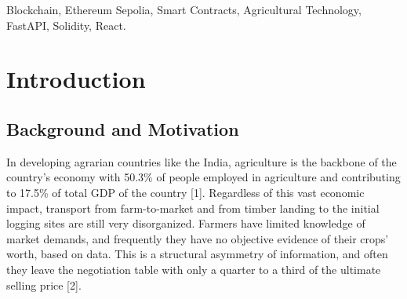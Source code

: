 \documentclass[conference]{IEEEtran}
\begin{document}
\begin{abstract}
At the moment, tracking agricultural produce to its origin is very large challenge as there is lack of market information transparency. This loss of information is the opportunity that middlemen take advantage of and reduces the power of farmers in their negotiations over their produce. To address this, we created FarmChain AI - a platform specifically created to empower farmers at harvest. We integrated Python-powered AI predictive tools with smart contracts on Ethereum that are untamperable. The heart of the system is built with React 18, Node.js, Express, Supabase, FastAPI and Solidity. The platform implements the complete supply chain lifecycle across six stakeholder roles: Farmer, Admin, Processor, Distributor, Retailer, and Consumer. Each custody transfer is permanently recorded on the Ethereum Sepolia Testnet via a \texttt{FarmChain.sol} smart contract that enforces cryptographic ownership verification. For market price prediction, we trained an XGBoost Regressor on 2{,}940 historical price records spanning 7 commodities across 7 Indian agricultural markets. The model uses 30 leakage-free time-series features and achieves a MAPE of 2.72\% and $R^2$ of 0.984 on a chronological test split of 294 samples. Data retrieval is free, but data posting requires a small gas fee ($\approx 0.00037$ ETH) to be placed on the blockchain. Consumer verification is facilitated through QR-code scanning and direct on-chain reads, providing a six-milestone authenticity checklist. At 14ms of API response time and 35ms for the price prediction of AI, this configuration shows that an affordable, responsive, and transparent harvest-logging software system is achievable without putting farmers under high pressure to pay expensive prices for enterprise corporate software.
\end{abstract}

\begin{IEEEkeywords}
Blockchain, Ethereum Sepolia, Smart Contracts, Agricultural Technology, FastAPI, Solidity, React.
\end{IEEEkeywords}

\section{Introduction}

\subsection{Background and Motivation}
In developing agrarian countries like the India, agriculture is the backbone of the country's economy with 50.3\% of people employed in agriculture and contributing to 17.5\% of total GDP of the country [1]. Regardless of this vast economic impact, transport from farm-to-market and from timber landing to the initial logging sites are still very disorganized. Farmers have limited knowledge of market demands, and frequently they have no objective evidence of their crops' worth, based on data. This is a structural asymmetry of information, and often they leave the negotiation table with only a quarter to a third of the ultimate selling price [2]. 
\end{document}
